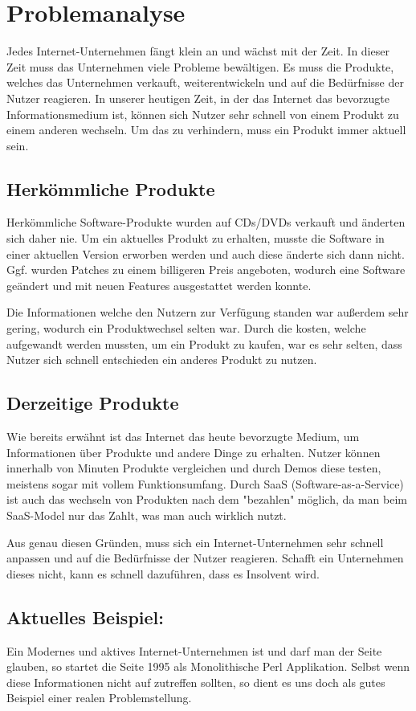 \chapter{Problemanalyse}
\label{chap:analyse}
Jedes Internet-Unternehmen fängt klein an und wächst mit der Zeit. In dieser Zeit muss das Unternehmen viele Probleme bewältigen. Es muss die Produkte, welches das Unternehmen verkauft, weiterentwickeln und auf die Bedürfnisse der Nutzer reagieren. In unserer heutigen Zeit, in der das Internet das bevorzugte Informationsmedium ist, können sich Nutzer sehr schnell von einem Produkt zu einem anderen wechseln. Um das zu verhindern, muss ein Produkt immer aktuell sein.

\section{Herkömmliche Produkte}
Herkömmliche Software-Produkte wurden auf CDs/DVDs verkauft und änderten sich daher nie. Um ein aktuelles Produkt zu erhalten, musste die Software in einer aktuellen Version erworben werden und auch diese änderte sich dann nicht. Ggf. wurden Patches zu einem billigeren Preis angeboten, wodurch eine Software geändert und mit neuen Features ausgestattet werden konnte.

Die Informationen welche den Nutzern zur Verfügung standen war außerdem sehr gering, wodurch ein Produktwechsel selten war. Durch die kosten, welche aufgewandt werden mussten, um ein Produkt zu kaufen, war es sehr selten, dass Nutzer sich schnell entschieden ein anderes Produkt zu nutzen.

\section{Derzeitige Produkte}
Wie bereits erwähnt ist das Internet das heute bevorzugte Medium, um Informationen über Produkte und andere Dinge zu erhalten. Nutzer können innerhalb von Minuten Produkte vergleichen und durch Demos diese testen, meistens sogar mit vollem Funktionsumfang. Durch SaaS (Software-as-a-Service) ist auch das wechseln von Produkten nach dem "bezahlen" möglich, da man beim SaaS-Model nur das Zahlt, was man auch wirklich nutzt.

Aus genau diesen Gründen, muss sich ein Internet-Unternehmen sehr schnell anpassen und auf die Bedürfnisse der Nutzer reagieren. Schafft ein Unternehmen dieses nicht, kann es schnell dazuführen, dass es Insolvent wird.

\section{Aktuelles Beispiel: \ebay}
Ein Modernes und aktives Internet-Unternehmen ist \ebay und darf man der Seite \cite{highscalability} glauben, so startet die Seite 1995 als Monolithische Perl Applikation. Selbst wenn diese Informationen nicht auf \ebay zutreffen sollten, so dient es uns doch als gutes Beispiel einer realen Problemstellung.

